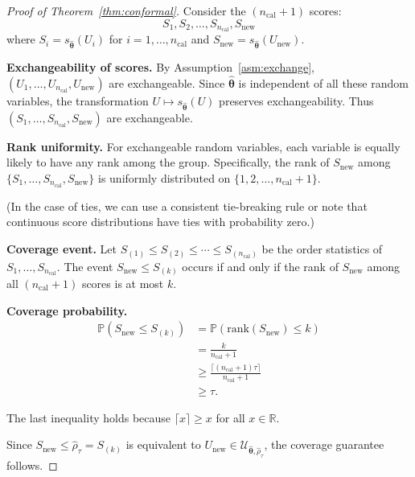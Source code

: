 \documentclass[lettersize,journal]{IEEEtran}
\newcommand{\R}{\mathbb{R}}
\newcommand{\Prob}{\mathbb{P}}
\newcommand{\cU}{\mathcal{U}}
\newcommand{\btheta}{\bm{\theta}}
\theoremstyle{definition}
\begin{document}
\begin{proof}[Proof of Theorem~\ref{thm:conformal}]
Consider the $(n_{\text{cal}} + 1)$ scores:
\begin{equation}
S_1, S_2, \ldots, S_{n_{\text{cal}}}, S_{\text{new}}
\end{equation}
where $S_i = s_{\hat{\btheta}}(U_i)$ for $i = 1, \ldots, n_{\text{cal}}$ and $S_{\text{new}} = s_{\hat{\btheta}}(U_{\text{new}})$.

\textbf{Exchangeability of scores.} By Assumption~\ref{asm:exchange}, $(U_1, \ldots, U_{n_{\text{cal}}}, U_{\text{new}})$ are exchangeable. Since $\hat{\btheta}$ is independent of all these random variables, the transformation $U \mapsto s_{\hat{\btheta}}(U)$ preserves exchangeability. Thus $(S_1, \ldots, S_{n_{\text{cal}}}, S_{\text{new}})$ are exchangeable.

\textbf{Rank uniformity.} For exchangeable random variables, each variable is equally likely to have any rank among the group. Specifically, the rank of $S_{\text{new}}$ among $\{S_1, \ldots, S_{n_{\text{cal}}}, S_{\text{new}}\}$ is uniformly distributed on $\{1, 2, \ldots, n_{\text{cal}} + 1\}$.

(In the case of ties, we can use a consistent tie-breaking rule or note that continuous score distributions have ties with probability zero.)

\textbf{Coverage event.} Let $S_{(1)} \leq S_{(2)} \leq \cdots \leq S_{(n_{\text{cal}})}$ be the order statistics of $S_1, \ldots, S_{n_{\text{cal}}}$. The event $S_{\text{new}} \leq S_{(k)}$ occurs if and only if the rank of $S_{\text{new}}$ among all $(n_{\text{cal}} + 1)$ scores is at most $k$.

\textbf{Coverage probability.}
\begin{align}
\Prob(S_{\text{new}} \leq S_{(k)}) &= \Prob(\text{rank}(S_{\text{new}}) \leq k) \nonumber \\
&= \frac{k}{n_{\text{cal}} + 1} \nonumber \\
&\geq \frac{\lceil (n_{\text{cal}} + 1)\tau \rceil}{n_{\text{cal}} + 1} \nonumber \\
&\geq \tau.
\end{align}

The last inequality holds because $\lceil x \rceil \geq x$ for all $x \in \R$.

Since $S_{\text{new}} \leq \hat{\rho}_\tau = S_{(k)}$ is equivalent to $U_{\text{new}} \in \cU_{\hat{\btheta}, \hat{\rho}_\tau}$, the coverage guarantee follows.
\end{proof}
\end{document}
